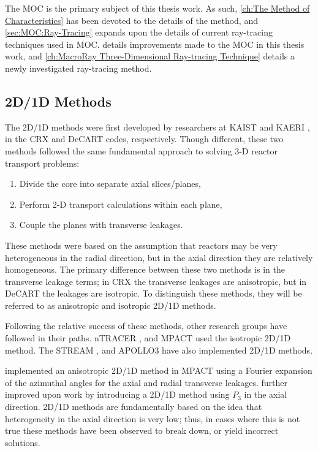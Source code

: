{{{      The \ac{MOC} is the primary subject of this thesis work.
      As such, \cref{ch:The Method of Characteristics} has been devoted to the details of the method, and \cref{sec:MOC:Ray-Tracing} expands upon the details of current ray-tracing techniques used in \ac{MOC}.
       details improvements made to the \ac{MOC} in this thesis work, and \cref{ch:MacroRay Three-Dimensional Ray-tracing Technique} details a newly investigated ray-tracing method.
    }

    
    
    

    \subsection{2D/1D Methods}{\label{ssec:3T:2D/1D Methods}
      The 2D/1D methods were first developed by researchers at \ac{KAIST} \cite{Cho2002} and \ac{KAERI} \cite{DeCART}, in the CRX and DeCART codes, respectively.
      Though different, these two methods followed the same fundamental approach to solving 3-D reactor transport problems:
      \begin{enumerate}
        \item{Divide the core into separate axial slices/planes,}
        \item{Perform 2-D transport calculations within each plane,}
        \item{Couple the planes with transverse leakages.}
      \end{enumerate}
      These methods were based on the assumption that reactors may be very heterogeneous in the radial direction, but in the axial direction they are relatively homogeneous.
      The primary difference between these two methods is in the transverse leakage terms; in CRX the transverse leakages are anisotropic, but in DeCART the leakages are isotropic.
      To distinguish these methods, they will be referred to as anisotropic and isotropic 2D/1D methods.

      Following the relative success of these methods, other research groups have followed in their paths.
      nTRACER \cite{Jung2009}, and MPACT \cite{MPACT2016} used the isotropic 2D/1D method.
      The STREAM \cite{Zheng2017}, and APOLLO3 \cite{Faure2018} have also implemented 2D/1D methods.

      \citet{Stimpson2015} implemented an anisotropic 2D/1D method in MPACT using a Fourier expansion of the azimuthal angles for the axial and radial transverse leakages.
      \citet{Jarrett2018} further improved upon  work by introducing a 2D/1D method using $P_3$ in the axial direction.
      2D/1D methods are fundamentally based on the idea that heterogeneity in the axial direction is very low;
      thus, in cases where this is not true these methods have been observed to break down, or yield incorrect solutions.

}}}
